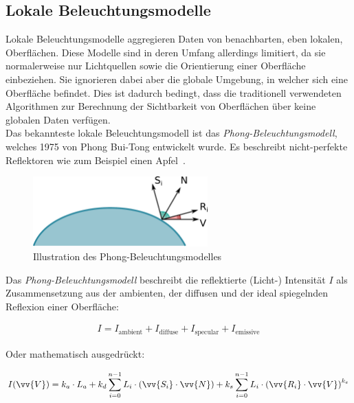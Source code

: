 \subsection{Lokale Beleuchtungsmodelle}
\label{subsec:local_illumination_models}

Lokale Beleuchtungsmodelle aggregieren Daten von benachbarten, eben
lokalen, Oberflächen. Diese Modelle sind in deren Umfang allerdings
limitiert, da sie normalerweise nur Lichtquellen sowie die Orientierung
einer Oberfläche einbeziehen. Sie ignorieren dabei aber die globale
Umgebung, in welcher sich eine Oberfläche befindet.  Dies ist dadurch
bedingt, dass die traditionell verwendeten Algorithmen zur Berechnung
der Sichtbarkeit von Oberflächen über keine globalen Daten verfügen.\\
Das bekannteste lokale Beleuchtungsmodell ist das
\textit{Phong-Beleuchtungsmodell}, welches 1975 von Phong Bui-Tong
entwickelt wurde\parencite{phong_illumination_1975}. Es beschreibt
nicht-perfekte Reflektoren wie zum Beispiel einen
Apfel~\parencite[Kapitel 16, Seite 729]{foley_computer_1996}.

\begin{figure}[H]
    \centering
    \includegraphics[width=0.6\textwidth]{img/phong_illumination_model.pdf}
    \caption{Illustration des Phong-Beleuchtungsmodelles\protect\footnotemark}\label{fig:phong_illustration}
\end{figure}

Das \textit{Phong-Beleuchtungsmodell} beschreibt die reflektierte
(Licht-) Intensität $I$ als Zusammensetzung aus der ambienten, der
diffusen und der ideal spiegelnden Reflexion einer Oberfläche:

\begin{gather}
    I = I_{\text{ambient}} + I_{\text{diffuse}} + I_{\text{specular}} + I_{\text{emissive}}
\end{gather}

Oder mathematisch ausgedrückt:

\begin{gather}\label{eq:phong_equation}
    I(\vv{V}) = k_{a} \cdot L_{a} +
                k_{d} \displaystyle\sum_{i=0}^{n - 1} L_{i} \cdot (\vv{S_{i}} \cdot \vv{N}) +
                k_{s} \displaystyle\sum_{i=0}^{n - 1} L_{i} \cdot {(\vv{R_{i}} \cdot \vv{V})}^{k_{e}}
\end{gather}

